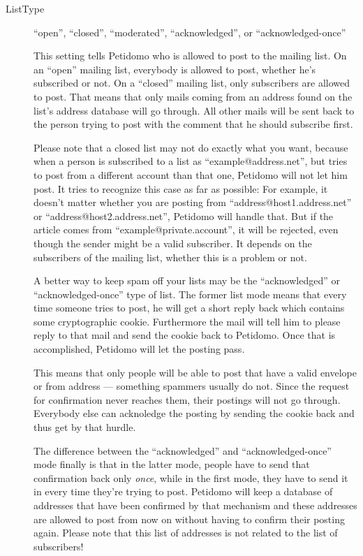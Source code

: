 \documentclass[a4paper,11pt]{scrreprt}
\begin{document}
\begin{description}

\item[ListType] \hfill ``open'', ``closed'',  ``moderated'',
``acknowledged'', or ``acknowledged-once''

This setting tells Petidomo who is allowed to post to the mailing
list. On an ``open'' mailing list, everybody is allowed to post,
whether he's subscribed or not. On a ``closed'' mailing list, only
subscribers are allowed to post. That means that only mails coming
from an address found on the list's address database will go through.
All other mails will be sent back to the person trying to post with
the comment that he should subscribe first.

Please note that a closed list may not do exactly what you want,
because when a person is subscribed to a list as
``example@address.net'', but tries to post from a different account
than that one, Petidomo will not let him post. It tries to recognize
this case as far as possible: For example, it doesn't matter whether
you are posting from ``address@host1.address.net'' or
``address@host2.address.net'', Petidomo will handle that. But if the
article comes from ``example@private.account'', it will be rejected,
even though the sender might be a valid subscriber. It depends on the
subscribers of the mailing list, whether this is a problem or not.

A better way to keep spam off your lists may be the ``acknowledged''
or ``acknowledged-once'' type of list. The former list mode means that
every time someone tries to post, he will get a short reply back which
contains some cryptographic cookie. Furthermore the mail will tell
him to please reply to that mail and send the cookie back to Petidomo.
Once that is accomplished, Petidomo will let the posting pass.

This means that only people will be able to post that have a valid
envelope or from address --- something spammers usually do not. Since
the request for confirmation never reaches them, their postings will
not go through. Everybody else can acknoledge the posting by sending
the cookie back and thus get by that hurdle.

The difference between the ``acknowledged'' and ``acknowledged-once''
mode finally is that in the latter mode, people have to send that
confirmation back only \emph{once}, while in the first mode, they have
to send it in every time they're trying to post. Petidomo will keep a
database of addresses that have been confirmed by that mechanism and
these addresses are allowed to post from now on without having to
confirm their posting again. Please note that this list of addresses
is not related to the list of subscribers!


\end{description}
\end{document}
